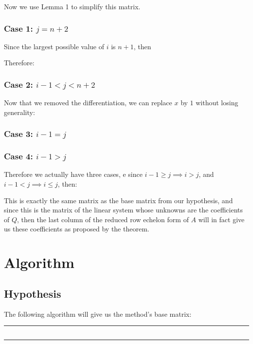 \documentclass[a4paper, 10pt]{article}
\def\lang{english}
\begin{document}
Now we use Lemma 1 to simplify this matrix.

\pagebreak
\subsubsection{Case 1: $j = n + 2$}

Since the largest possible value of $i$ is $n+1$, then

\caseOneComparison

Therefore:

\caseOneResult

\subsubsection{Case 2: $i - 1 < j < n + 2$}

\caseTwoPartOne

Now that we removed the differentiation, we can replace $x$ by $1$ without losing generality:

\caseTwoPartTwo

\subsubsection{Case 3: $i - 1 = j$}

\caseThree

\subsubsection{Case 4: $i - 1 > j$}

\caseFour

Therefore we actually have three cases, e since $i - 1 \geq j \implies i > j$, and $i - 1 < j \implies i \leq j$, then:

\aijDef

This is exactly the same matrix as the base matrix from our hypothesis, and since this is the matrix of the linear system whose unknowns are the coefficients of $Q$, then the last column of the reduced row echelon form of $A$ will in fact give us these coefficients as proposed by the theorem.

\pagebreak
\section{Algorithm}

\subsection{Hypothesis}
The following algorithm will give us the method's base matrix:\\
\hrule
\inputminted[linenos]{code/\lang.py:AlgLexer -x}{code/\lang.alg}
\hrule
\end{document}
